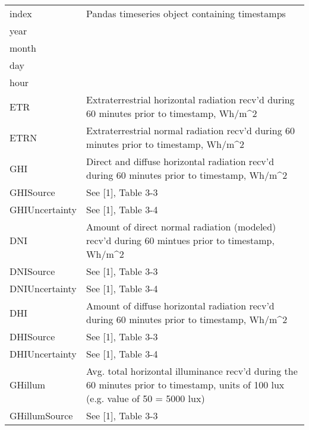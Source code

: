 \documentclass[letterpaper,10pt,english]{sphinxmanual}
\begin{document}
\begin{fulllineitems}
\begin{longtable}{|l|p{11cm}|}
\endlastfoot


index
 & 
Pandas timeseries object containing timestamps
\\

year
 & \\

month
 & \\

day
 & \\

hour
 & \\

ETR
 & 
Extraterrestrial horizontal radiation recv'd during 60 minutes prior to timestamp, Wh/m\textasciicircum{}2
\\

ETRN
 & 
Extraterrestrial normal radiation recv'd during 60 minutes prior to timestamp, Wh/m\textasciicircum{}2
\\

GHI
 & 
Direct and diffuse horizontal radiation recv'd during 60 minutes prior to timestamp, Wh/m\textasciicircum{}2
\\

GHISource
 & 
See {[}1{]}, Table 3-3
\\

GHIUncertainty
 & 
See {[}1{]}, Table 3-4
\\

DNI
 & 
Amount of direct normal radiation (modeled) recv'd during 60 mintues prior to timestamp, Wh/m\textasciicircum{}2
\\

DNISource
 & 
See {[}1{]}, Table 3-3
\\

DNIUncertainty
 & 
See {[}1{]}, Table 3-4
\\

DHI
 & 
Amount of diffuse horizontal radiation recv'd during 60 minutes prior to timestamp, Wh/m\textasciicircum{}2
\\

DHISource
 & 
See {[}1{]}, Table 3-3
\\

DHIUncertainty
 & 
See {[}1{]}, Table 3-4
\\

GHillum
 & 
Avg. total horizontal illuminance recv'd during the 60 minutes prior to timestamp, units of 100 lux (e.g. value of 50 = 5000 lux)
\\

GHillumSource
 & 
See {[}1{]}, Table 3-3
\\


\end{longtable}
\end{fulllineitems}
\end{document}
